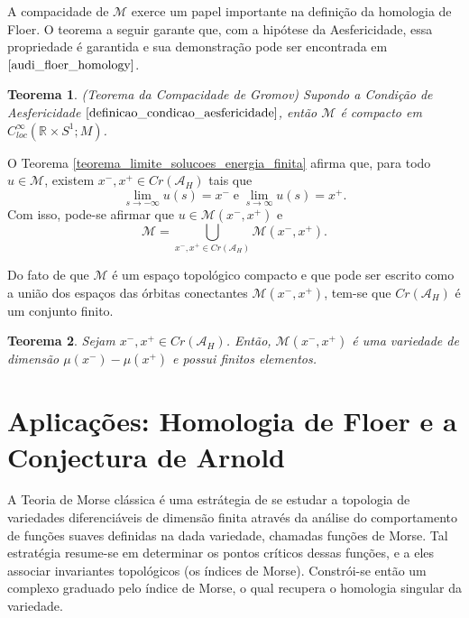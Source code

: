 \documentclass[12pt]{book}
\newtheorem{teorema}{Teorema}[section]
\newcommand{\circulo}{S^{1}}
\newcommand{\energiafinitaM}{\mathcal{M}}
\newcommand{\energiafinitaMconectante}{\energiafinitaM(x^{-}, x^{+})}
\newcommand{\funcionalH}{\mathcal{A}_{H}}
\newcommand{\pontoscriticos}[1]{\textit{Cr}(#1)}
\newcommand{\retacartesianocirculo}{\real{} \times \circulo}
\newcommand{\real}[1]{\mathbb{R}^{#1}}
\begin{document}
	A compacidade de $\energiafinitaM$ exerce um papel importante na definição da homologia de Floer. O teorema a seguir garante que, com a hipótese da Aesfericidade, essa propriedade é garantida e sua demonstração pode ser encontrada em $\cite{audi_floer_homology}$.
	
	\begin{teorema}\label{teorema_compacidade_gromov}
		(Teorema da Compacidade de Gromov) Supondo a Condição de Aesfericidade $\ref{definicao_condicao_aesfericidade}$, então $\energiafinitaM$ é compacto em $C^{\infty}_{loc}(\retacartesianocirculo; M)$.
	\end{teorema}
	
	O Teorema \ref{teorema_limite_solucoes_energia_finita} afirma que, para todo $u\in \energiafinitaM$, existem $x^{-}, x^{+}\in \pontoscriticos{\funcionalH}$ tais que 
	$$
	\lim_{s\to -\infty}u(s)=x^{-}\; \text{e} \; \lim_{s\to \infty}u(s)=x^{+}.
	$$
	Com isso, pode-se afirmar que $u\in \energiafinitaMconectante$ e 
	$$
	\energiafinitaM = \bigcup_{x^{-}, x^{+}\in  \pontoscriticos{\funcionalH}}\energiafinitaMconectante.
	$$

	Do fato de que $\energiafinitaM$ é um espaço topológico compacto e que pode ser escrito como a união dos espaços das órbitas conectantes $\energiafinitaMconectante$, tem-se que $\pontoscriticos{\funcionalH}$ é um conjunto finito.
	
	\begin{teorema}\label{teorema_orbitas_conectantes_finitas}
		Sejam $x^{-}, x^{+} \in \pontoscriticos{\funcionalH}$. Então, $\energiafinitaMconectante$ é uma variedade de dimensão $\mu(x^{-})-\mu(x^{+})$ e possui finitos elementos.
	\end{teorema}
		
	\chapter{Aplicações: Homologia de Floer e a Conjectura de Arnold}\label{capitulo_homologia_floer}
	
	A Teoria de Morse clássica é uma estrátegia de se estudar a topologia de variedades diferenciáveis de dimensão finita através da análise do comportamento de funções suaves definidas na dada variedade, chamadas funções de Morse. Tal estratégia resume-se em determinar os pontos críticos dessas funções, e a eles associar invariantes topológicos (os índices de Morse). Constrói-se então um complexo graduado pelo índice de Morse, o qual recupera o homologia singular da variedade.
	
\end{document}
